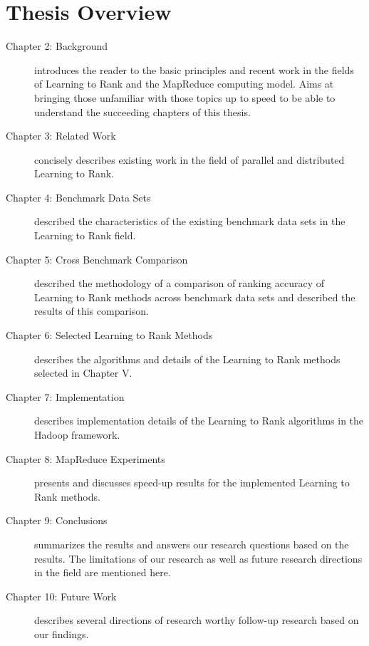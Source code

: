 \section{Thesis Overview}
\begin{description}
\item[Chapter 2: Background]{introduces the reader to the basic principles and recent work in the fields of Learning to Rank and the MapReduce computing model. Aims at bringing those unfamiliar with those topics up to speed to be able to understand the succeeding chapters of this thesis.}
\item[Chapter 3: Related Work]{concisely describes existing work in the field of parallel and distributed Learning to Rank.}
\item[Chapter 4: Benchmark Data Sets]{described the characteristics of the existing benchmark data sets in the Learning to Rank field.}
\item[Chapter 5: Cross Benchmark Comparison]{described the methodology of a comparison of ranking accuracy of Learning to Rank methods across benchmark data sets and described the results of this comparison.}
\item[Chapter 6: Selected Learning to Rank Methods]{describes the algorithms and details of the Learning to Rank methods selected in Chapter V.}
\item[Chapter 7: Implementation]{describes implementation details of the Learning to Rank algorithms in the Hadoop framework.}
\item[Chapter 8: MapReduce Experiments]{presents and discusses speed-up results for the implemented Learning to Rank methods.}
\item[Chapter 9: Conclusions]{summarizes the results and answers our research questions based on the results. The limitations of our research as well as future research directions in the field are mentioned here.}
\item[Chapter 10: Future Work]{describes several directions of research worthy follow-up research based on our findings.}
\end{description}